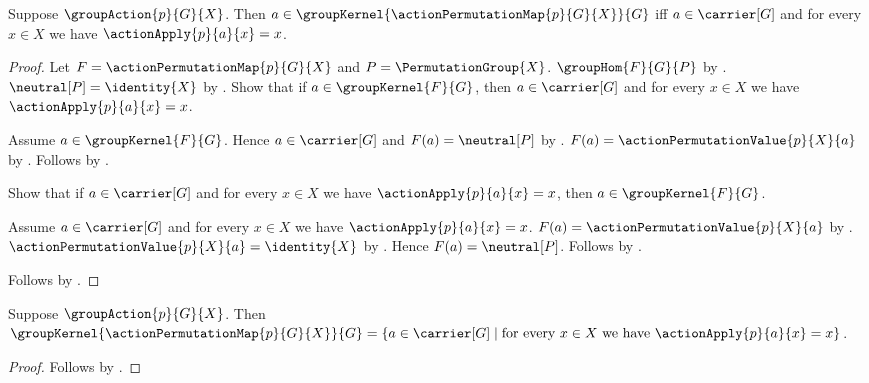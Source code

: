 \begin{proposition}\label{action_permutation_map_kernel_iff}
    Suppose $\groupAction{p}{G}{X}$.
    Then
        $a\in\groupKernel{\actionPermutationMap{p}{G}{X}}{G}$ iff
        $a\in\carrier[G]$ and
            for every $x\in X$ we have $\actionApply{p}{a}{x}=x$.
\end{proposition}
\begin{proof}
    Let $F=\actionPermutationMap{p}{G}{X}$ and
        $P=\PermutationGroup{X}$.
    $\groupHom{F}{G}{P}$ by
        .
    $\neutral[P]=\identity{X}$ by
        .
    Show that if $a\in\groupKernel{F}{G}$, then
        $a\in\carrier[G]$ and for every $x\in X$ we have
            $\actionApply{p}{a}{x}=x$.
    \begin{subproof}
        Assume $a\in\groupKernel{F}{G}$.
        Hence $a\in\carrier[G]$ and $F(a)=\neutral[P]$ by
            .
        $F(a)=\actionPermutationValue{p}{X}{a}$ by
            .
        Follows by
            .
    \end{subproof}
    Show that if $a\in\carrier[G]$ and for every $x\in X$ we have
        $\actionApply{p}{a}{x}=x$, then
        $a\in\groupKernel{F}{G}$.
    \begin{subproof}
        Assume $a\in\carrier[G]$ and for every $x\in X$ we have
            $\actionApply{p}{a}{x}=x$.
        $F(a)=\actionPermutationValue{p}{X}{a}$ by
            .
        $\actionPermutationValue{p}{X}{a}=\identity{X}$ by
            .
        Hence $F(a)=\neutral[P]$.
        Follows by .
    \end{subproof}
    Follows by \auto.
\end{proof}

\begin{theorem}\label{action_permutation_map_kernel}
    Suppose $\groupAction{p}{G}{X}$.
    Then
        $\groupKernel{\actionPermutationMap{p}{G}{X}}{G}
        =\{a\in\carrier[G]\mid
            \text{for every $x\in X$ we have
                $\actionApply{p}{a}{x}=x$}\}$.
\end{theorem}
\begin{proof}
    Follows by
        .
\end{proof}

